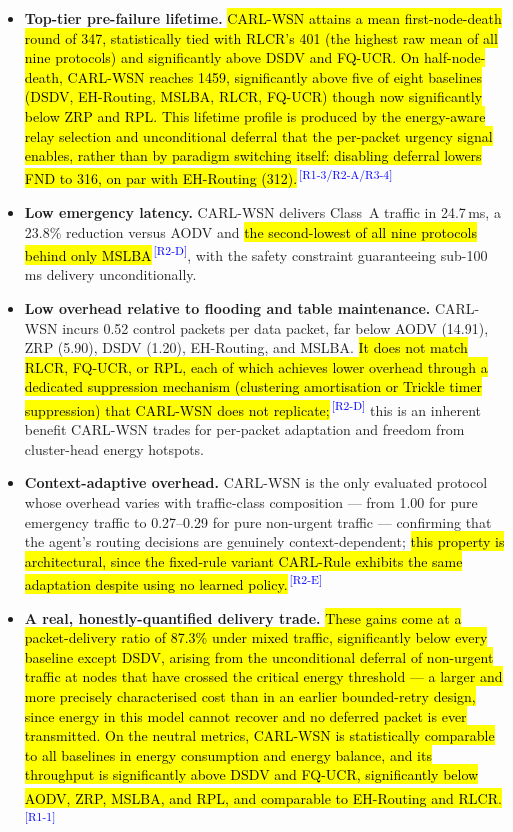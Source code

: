 \documentclass[12pt]{article}
\newcommand{\rtag}[1]{\textsuperscript{\textcolor{blue}{\scriptsize\,[#1]}}}
\newcommand{\hlx}[1]{{\exhyphenpenalty=10000\hyphenpenalty=10000\let\ \nobreakspace\hl{#1}}}
\begin{document}
\begin{itemize}
\item \textbf{Top-tier pre-failure lifetime.} \hlx{CARL-WSN attains a
mean first-node-death round of 347, statistically tied with RLCR's
401 (the highest raw mean of all nine protocols) and significantly
above DSDV and FQ-UCR. On half-node-death, CARL-WSN reaches 1459,
significantly above five of eight baselines (DSDV, EH-Routing,
MSLBA, RLCR, FQ-UCR) though now significantly below ZRP and RPL.
This lifetime profile is produced by the energy-aware relay
selection and unconditional deferral that the per-packet urgency
signal enables, rather than by paradigm switching itself: disabling
deferral lowers FND to 316, on par with EH-Routing (312).}\rtag{R1-3/R2-A/R3-4}

\item \textbf{Low emergency latency.} CARL-WSN delivers Class~A
traffic in 24.7\,ms, a 23.8\% reduction versus AODV and \hlx{the
second-lowest of all nine protocols behind only MSLBA}\rtag{R2-D}, with the
safety constraint guaranteeing sub-100\,ms delivery unconditionally.

\item \textbf{Low overhead relative to flooding and table
maintenance.} CARL-WSN incurs 0.52 control packets per data packet,
far below AODV (14.91), ZRP (5.90), DSDV (1.20), EH-Routing, and
MSLBA. \hlx{It does not match RLCR, FQ-UCR, or RPL, each of which
achieves lower overhead through a dedicated suppression mechanism
(clustering amortisation or Trickle timer suppression) that CARL-WSN
does not replicate;}\rtag{R2-D} this is an inherent benefit CARL-WSN trades for
per-packet adaptation and freedom from cluster-head energy hotspots.

\item \textbf{Context-adaptive overhead.} CARL-WSN is the only
evaluated protocol whose overhead varies with traffic-class
composition --- from 1.00 for pure emergency traffic to 0.27--0.29
for pure non-urgent traffic --- confirming that the agent's routing
decisions are genuinely context-dependent; \hlx{this property is
architectural, since the fixed-rule variant CARL-Rule exhibits the
same adaptation despite using no learned policy.}\rtag{R2-E}

\item \textbf{A real, honestly-quantified delivery trade.} \hlx{These
gains come at a packet-delivery ratio of 87.3\% under mixed traffic,
significantly below every baseline except DSDV, arising from the
unconditional deferral of non-urgent traffic at nodes that have
crossed the critical energy threshold --- a larger and more
precisely characterised cost than in an earlier bounded-retry
design, since energy in this model cannot recover and no deferred
packet is ever transmitted. On the neutral metrics, CARL-WSN is
statistically comparable to all baselines in energy consumption and
energy balance, and its throughput is significantly above DSDV and
FQ-UCR, significantly below AODV, ZRP, MSLBA, and RPL, and
comparable to EH-Routing and RLCR.}\rtag{R1-1}
\end{itemize}
\end{document}
